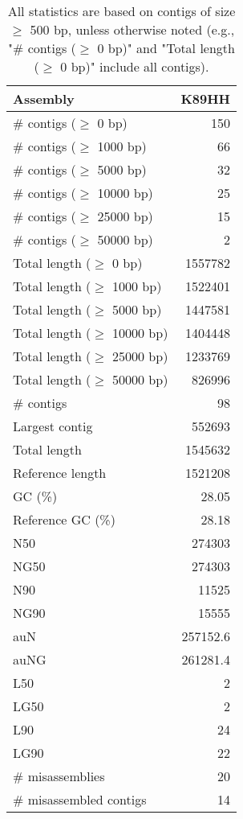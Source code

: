 \documentclass[12pt,a4paper]{article}
\begin{document}
\begin{table}[ht]
\begin{center}
\caption{All statistics are based on contigs of size $\geq$ 500 bp, unless otherwise noted (e.g., "\# contigs ($\geq$ 0 bp)" and "Total length ($\geq$ 0 bp)" include all contigs).}
\begin{tabular}{|l*{1}{|r}|}
\hline
Assembly & K89HH \\ \hline
\# contigs ($\geq$ 0 bp) & 150 \\ \hline
\# contigs ($\geq$ 1000 bp) & 66 \\ \hline
\# contigs ($\geq$ 5000 bp) & 32 \\ \hline
\# contigs ($\geq$ 10000 bp) & 25 \\ \hline
\# contigs ($\geq$ 25000 bp) & 15 \\ \hline
\# contigs ($\geq$ 50000 bp) & 2 \\ \hline
Total length ($\geq$ 0 bp) & 1557782 \\ \hline
Total length ($\geq$ 1000 bp) & 1522401 \\ \hline
Total length ($\geq$ 5000 bp) & 1447581 \\ \hline
Total length ($\geq$ 10000 bp) & 1404448 \\ \hline
Total length ($\geq$ 25000 bp) & 1233769 \\ \hline
Total length ($\geq$ 50000 bp) & 826996 \\ \hline
\# contigs & 98 \\ \hline
Largest contig & 552693 \\ \hline
Total length & 1545632 \\ \hline
Reference length & 1521208 \\ \hline
GC (\%) & 28.05 \\ \hline
Reference GC (\%) & 28.18 \\ \hline
N50 & 274303 \\ \hline
NG50 & 274303 \\ \hline
N90 & 11525 \\ \hline
NG90 & 15555 \\ \hline
auN & 257152.6 \\ \hline
auNG & 261281.4 \\ \hline
L50 & 2 \\ \hline
LG50 & 2 \\ \hline
L90 & 24 \\ \hline
LG90 & 22 \\ \hline
\# misassemblies & 20 \\ \hline
\# misassembled contigs & 14 \\ \hline

\end{tabular}
\end{center}
\end{table}
\end{document}
